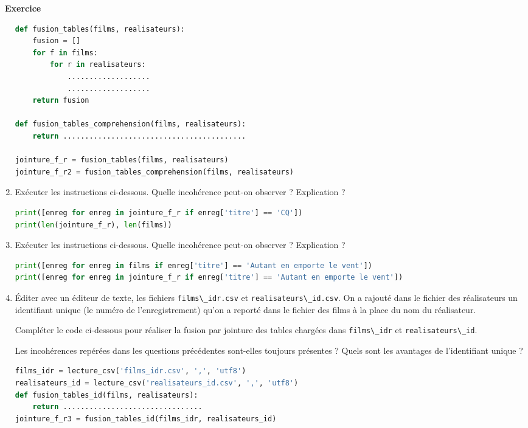 \documentclass[
  11pt,
]{article}
\newcommand{\passthrough}[1]{#1}
\newcounter{exo}
\newenvironment{exercice}[1]
{\par \medskip   \addtocounter{exo}{1} \noindent  
\begin{bclogo}[arrondi =0.1,   noborder = true, logo=\bccrayon, marge=4]{~\textbf{Exercice} \textbf{\theexo} {\itshape #1} }  \par}
{
\end{bclogo}
 \par \bigskip }
\newcounter{def}
\begin{document}
\begin{exercice}{}
\begin{enumerate}
\begin{lstlisting}[language=Python]
def fusion_tables(films, realisateurs):
    fusion = []
    for f in films:
        for r in realisateurs:
            ...................
            ...................
    return fusion

def fusion_tables_comprehension(films, realisateurs):   
    return ..........................................

jointure_f_r = fusion_tables(films, realisateurs)
jointure_f_r2 = fusion_tables_comprehension(films, realisateurs)
\end{lstlisting}
\item
  Exécuter les instructions ci-dessous. Quelle incohérence peut-on
  observer ? Explication ?

\begin{lstlisting}[language=Python]
print([enreg for enreg in jointure_f_r if enreg['titre'] == 'CQ'])
print(len(jointure_f_r), len(films))
\end{lstlisting}
\item
  Exécuter les instructions ci-dessous. Quelle incohérence peut-on
  observer ? Explication ?

\begin{lstlisting}[language=Python]
print([enreg for enreg in films if enreg['titre'] == 'Autant en emporte le vent'])
print([enreg for enreg in jointure_f_r if enreg['titre'] == 'Autant en emporte le vent'])
\end{lstlisting}
\item
  Éditer avec un éditeur de texte, les fichiers
  \passthrough{\lstinline!films\_idr.csv!} et
  \passthrough{\lstinline!realisateurs\_id.csv!}. On a rajouté dans le
  fichier des réalisateurs un identifiant unique (le numéro de
  l'enregistrement) qu'on a reporté dans le fichier des films à la place
  du nom du réalisateur.

  Compléter le code ci-dessous pour réaliser la fusion par jointure des
  tables chargées dans \passthrough{\lstinline!films\_idr!} et
  \passthrough{\lstinline!realisateurs\_id!}.

  Les incohérences repérées dans les questions précédentes sont-elles
  toujours présentes ? Quels sont les avantages de l'identifiant unique
  ?

\begin{lstlisting}[language=Python]
films_idr = lecture_csv('films_idr.csv', ',', 'utf8')
realisateurs_id = lecture_csv('realisateurs_id.csv', ',', 'utf8')
def fusion_tables_id(films, realisateurs):   
    return ................................
jointure_f_r3 = fusion_tables_id(films_idr, realisateurs_id)
\end{lstlisting}
\end{enumerate}

\end{exercice}
\end{document}
